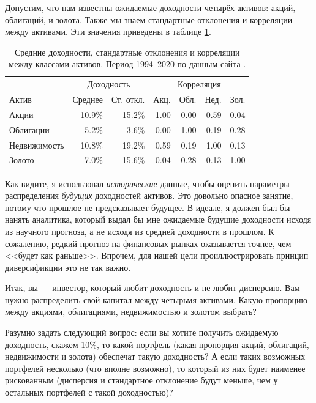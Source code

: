 Допустим, что нам известны ожидаемые доходности четырёх активов: акций, облигаций,  и золота. Также мы знаем стандартные отклонения и корреляции между активами. Эти значения приведены в таблице \ref{asset_class_returns_table}.

\begin{table}[h]
\centering
\begin{tabular}{l|r|r|r|r|r|r}
 & \multicolumn{2}{c|}{Доходность} & \multicolumn{4}{c}{Корреляция} \\ \cline{2-7}
Актив        & Среднее & Ст. откл. & Акц. & Обл. & Нед. & Зол. \\ \hline
Акции        & 10.9\%  & 15.2\%    & 1.00  & 0.00   & 0.59    & 0.04 \\
Облигации    & 5.2\%   & 3.6\%     & 0.00  & 1.00   & 0.19    & 0.28 \\
Недвижимость & 10.8\%  & 19.2\%    & 0.59  & 0.19   & 1.00    & 0.13 \\
Золото       & 7.0\%   & 15.6\%    & 0.04  & 0.28   & 0.13    & 1.00
\end{tabular}
\caption{Средние доходности, стандартные отклонения и корреляции между классами активов. Период 1994--2020 по данным сайта .}
\label{asset_class_returns_table}
\end{table}

Как видите, я использовал \emph{исторические} данные, чтобы оценить параметры распределения \emph{будущих} доходностей активов. Это довольно опасное занятие, потому что прошлое не предсказывает будущее. В идеале, я должен был бы нанять аналитика, который выдал бы мне ожидаемые будущие доходности исходя из научного прогноза, а не исходя из средней доходности в прошлом. К сожалению, редкий прогноз на финансовых рынках оказывается точнее, чем <<будет как раньше>>. Впрочем, для нашей цели проиллюстрировать принцип диверсификции это не так важно.

Итак, вы --- инвестор, который любит доходность и не любит дисперсию. Вам нужно распределить свой капитал между четырьмя активами. Какую пропорцию между акциями, облигациями, недвижимостью и золотом выбрать?

Разумно задать следующий вопрос: если вы хотите получить ожидаемую доходность, скажем 10\%, то какой портфель (какая пропорция акций, облигаций, недвижимости и золота) обеспечат такую доходность? А если таких возможных портфелей несколько (что вполне возможно), то который из них будет наименее рискованным (дисперсия и стандартное отклонение будут меньше, чем у остальных портфелей с такой доходностью)?

